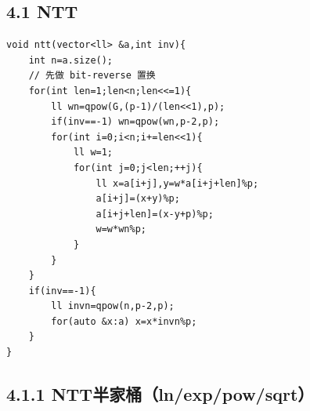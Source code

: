 \documentclass[UTF8,a4paper,11pt]{ctexart}
\begin{document}
\subsection*{4.1 NTT}

\begin{Verbatim}[fontsize=\small,frame=single,breaklines=true,breakanywhere=true]
void ntt(vector<ll> &a,int inv){
    int n=a.size();
    // 先做 bit-reverse 置换
    for(int len=1;len<n;len<<=1){
        ll wn=qpow(G,(p-1)/(len<<1),p);
        if(inv==-1) wn=qpow(wn,p-2,p);
        for(int i=0;i<n;i+=len<<1){
            ll w=1;
            for(int j=0;j<len;++j){
                ll x=a[i+j],y=w*a[i+j+len]%p;
                a[i+j]=(x+y)%p;
                a[i+j+len]=(x-y+p)%p;
                w=w*wn%p;
            }
        }
    }
    if(inv==-1){
        ll invn=qpow(n,p-2,p);
        for(auto &x:a) x=x*invn%p;
    }
}
\end{Verbatim}
\subsection*{4.1.1 NTT半家桶（ln/exp/pow/sqrt）}
\end{document}
